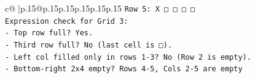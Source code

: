 \documentclass{article}
\begin{document}
{\begin{supertabular}{c@{$\;$}|p{.15\linewidth}@{}p{.15\linewidth}p{.15\linewidth}p{.15\linewidth}p{.15\linewidth}p{.15\linewidth}}
{{{\texttt{Row 5: X □ □ □ □} \\
\texttt{Expression check for Grid 3:} \\
\texttt{{-} Top row full? Yes.} \\
\texttt{{-} Third row full? No (last cell is □).} \\
\texttt{{-} Left col filled only in rows 1{-}3? No (Row 2 is empty).} \\
\texttt{{-} Bottom{-}right 2x4 empty? Rows 4{-}5, Cols 2{-}5 are empty} \\
            }
        }
    }
     \\ \\

\end{supertabular}
}
\end{document}
